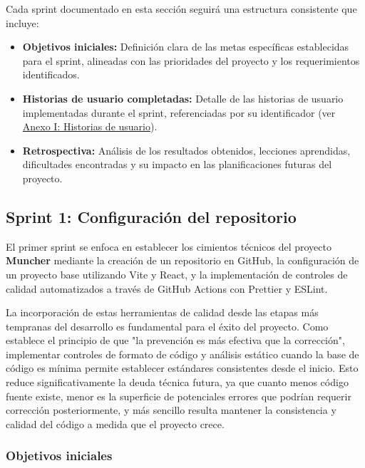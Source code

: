 Cada sprint documentado en esta sección seguirá una estructura consistente que incluye:

\begin{itemize}
    \item \textbf{Objetivos iniciales:} Definición clara de las metas específicas establecidas para el sprint, alineadas con las prioridades del proyecto y los requerimientos identificados.
    \item \textbf{Historias de usuario completadas:} Detalle de las historias de usuario implementadas durante el sprint, referenciadas por su identificador (ver \hyperref[sec:anexo-historias-usuario]{Anexo I: Historias de usuario}).
    \item \textbf{Retrospectiva:} Análisis de los resultados obtenidos, lecciones aprendidas, dificultades encontradas y su impacto en las planificaciones futuras del proyecto.
\end{itemize}

\subsection*{Sprint 1: Configuración del repositorio}

El primer sprint se enfoca en establecer los cimientos técnicos del proyecto \textbf{Muncher} mediante la creación de un repositorio en GitHub, la configuración de un proyecto base utilizando Vite y React, y la implementación de controles de calidad automatizados a través de GitHub Actions con Prettier y ESLint.

La incorporación de estas herramientas de calidad desde las etapas más tempranas del desarrollo es fundamental para el éxito del proyecto. Como establece el principio de que "la prevención es más efectiva que la corrección", implementar controles de formato de código y análisis estático cuando la base de código es mínima permite establecer estándares consistentes desde el inicio. Esto reduce significativamente la deuda técnica futura, ya que cuanto menos código fuente existe, menor es la superficie de potenciales errores que podrían requerir corrección posteriormente, y más sencillo resulta mantener la consistencia y calidad del código a medida que el proyecto crece.

\subsubsection*{Objetivos iniciales}

